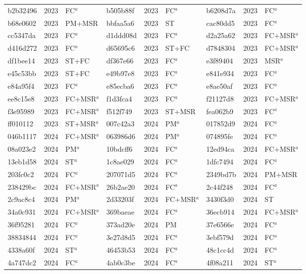 \begin{longtable}{lll@{\hspace{10pt}}lll@{\hspace{10pt}}lll}
b2b32496 & 2023 & FC$^{a}$ & b505b88f & 2023 & FC$^{a}$ & b6208d7a & 2023 & FC$^{a}$ \\
b68e0602 & 2023 & PM+MSR & bbfaa5a6 & 2023 & ST & cac80dd5 & 2023 & FC$^{a}$ \\
cc5347da & 2023 & FC$^{a}$ & d1ddd08d & 2023 & FC$^{a}$ & d2a25a62 & 2023 & FC+MSR$^{a}$ \\
d416d272 & 2023 & FC$^{a}$ & d65695c6 & 2023 & ST+FC & d7848304 & 2023 & FC+MSR$^{a}$ \\
df1bee14 & 2023 & ST+FC & df367e66 & 2023 & FC$^{a}$ & e3f89404 & 2023 & MSR$^{a}$ \\
e45c53bb & 2023 & ST+FC & e49b97e8 & 2023 & FC$^{a}$ & e841e934 & 2023 & FC$^{a}$ \\
e84a95f4 & 2023 & FC$^{a}$ & e85ecba6 & 2023 & FC$^{a}$ & e8ae50af & 2023 & FC$^{a}$ \\
ee8c15e8 & 2023 & FC+MSR$^{a}$ & f1d3fca4 & 2023 & FC$^{a}$ & f21127d8 & 2023 & FC+MSR$^{a}$ \\
f3e95989 & 2023 & FC+MSR$^{a}$ & f512f749 & 2023 & ST+MSR & fea062b9 & 2023 & FC$^{a}$ \\
ff010112 & 2023 & ST+MSR$^{a}$ & 007c42a3 & 2024 & PM$^{a}$ & 017852d9 & 2024 & FC$^{a}$ \\
046b1117 & 2024 & FC+MSR$^{a}$ & 063986d6 & 2024 & PM$^{a}$ & 074895fe & 2024 & FC$^{a}$ \\
08a023e2 & 2024 & PM$^{a}$ & 10bdcff6 & 2024 & FC$^{a}$ & 12ed94ca & 2024 & FC+MSR$^{a}$ \\
13eb1d58 & 2024 & ST$^{a}$ & 1c8ae029 & 2024 & FC$^{a}$ & 1dfc7494 & 2024 & FC$^{a}$ \\
203fc0c2 & 2024 & FC$^{a}$ & 207071d5 & 2024 & FC$^{a}$ & 2349bd7b & 2024 & PM+MSR \\
238429bc & 2024 & FC+MSR$^{a}$ & 26b2ae20 & 2024 & FC$^{a}$ & 2c44f248 & 2024 & FC$^{a}$ \\
2c9ac8c4 & 2024 & PM$^{a}$ & 2d33203f & 2024 & FC+MSR$^{a}$ & 3430f3d0 & 2024 & ST \\
34a0c931 & 2024 & FC+MSR$^{a}$ & 369baeae & 2024 & FC$^{a}$ & 36ecb914 & 2024 & FC+MSR$^{a}$ \\
36f95281 & 2024 & FC$^{a}$ & 373ad20e & 2024 & PM & 37e6566e & 2024 & FC$^{a}$ \\
38834844 & 2024 & FC$^{a}$ & 3e27d8d5 & 2024 & FC$^{a}$ & 3ebf579d & 2024 & FC$^{a}$ \\
4338a60f & 2024 & ST$^{a}$ & 46453b53 & 2024 & FC$^{a}$ & 48c1cc4d & 2024 & FC$^{a}$ \\
4a747dc2 & 2024 & FC$^{a}$ & 4ab0c3be & 2024 & FC$^{a}$ & 4f08a211 & 2024 & ST$^{a}$ \\

\end{longtable}
